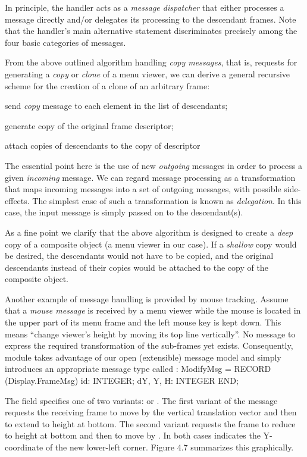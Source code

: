 \noindent In principle, the handler acts as a \emph{message dispatcher} that
either processes a message directly and/or delegates its processing to
the descendant frames. Note that the handler's main alternative
statement discriminates precisely among the four basic categories of
messages.

From the above outlined algorithm handling \emph{copy messages}, that
is, requests for generating a \emph{copy} or \emph{clone} of a menu
viewer, we can derive a general recursive scheme for the creation of a
clone of an arbitrary frame:

send \emph{copy} message to each element in the list of descendants;

generate copy of the original frame descriptor;

attach copies of descendants to the copy of descriptor

\noindent The essential point here is the use of new \emph{outgoing} messages in order
to process a given \emph{incoming} message. We can regard message processing
as a transformation that maps incoming messages into a set of outgoing
messages, with possible side-effects. The simplest case of such a
transformation is known as \emph{delegation}. In this case, the input message
is simply passed on to the descendant(s).

As a fine point we clarify that the above algorithm is designed to
create a \emph{deep} copy of a composite object (a menu viewer in our
case). If a \emph{shallow} copy would be desired, the descendants would not
have to be copied, and the original descendants instead of their
copies would be attached to the copy of the composite object.

Another example of message handling is provided by mouse
tracking. Assume that a \emph{mouse message} is received by a menu viewer
while the mouse is located in the upper part of its menu frame and the
left mouse key is kept down. This means ``change viewer's height by
moving its top line vertically''. No message to express the required
transformation of the sub-frames yet exists. Consequently, module
 takes advantage of our open (extensible) message model and
simply introduces an appropriate message type called :
\begintt
ModifyMsg = RECORD (Display.FrameMsg)
  id: INTEGER;
  dY, Y, H: INTEGER
END;
\endtt

\noindent The field  specifies one of two variants:  or . The
first variant of the message requests the receiving frame to move by
the vertical translation vector  and then to extend to height  at
bottom. The second variant requests the frame to reduce to height  at
bottom and then to move by . In both cases  indicates the
Y-coordinate of the new lower-left corner. Figure 4.7 summarizes this
graphically.

